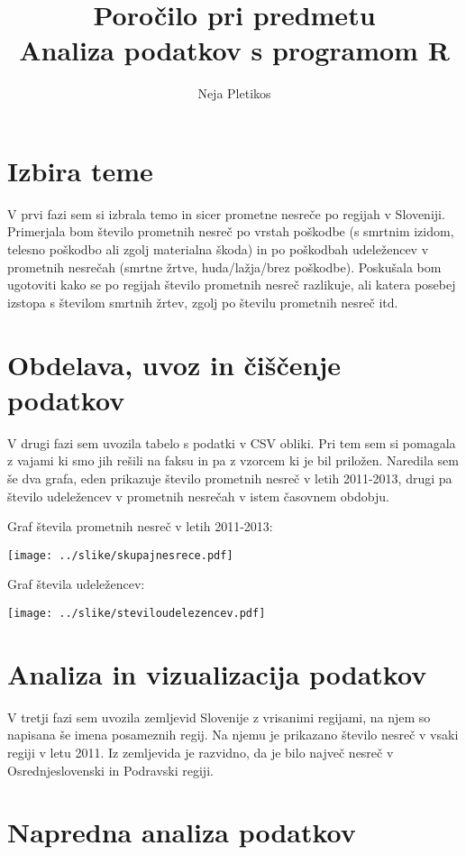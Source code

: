 \documentclass[11pt,a4paper]{article}
\begin{document}
\title{Poročilo pri predmetu \\
Analiza podatkov s programom R}
\author{Neja Pletikos}
\maketitle

\section{Izbira teme}

V prvi fazi sem si izbrala temo in sicer prometne nesreče po regijah v Sloveniji. Primerjala bom število prometnih nesreč po vrstah poškodbe (s smrtnim izidom, telesno poškodbo ali zgolj materialna škoda) in po poškodbah udeležencev v prometnih nesrečah (smrtne žrtve, huda/lažja/brez poškodbe). Poskušala bom ugotoviti kako se po regijah število prometnih nesreč razlikuje, ali katera posebej izstopa s številom smrtnih žrtev, zgolj po številu prometnih nesreč itd.

\section{Obdelava, uvoz in čiščenje podatkov}

V drugi fazi sem uvozila tabelo s podatki v CSV obliki. Pri tem sem si pomagala z vajami ki smo jih rešili na faksu in pa z vzorcem ki je bil priložen. Naredila sem še dva grafa, eden prikazuje število prometnih nesreč v letih 2011-2013, drugi pa število udeležencev v prometnih nesrečah v istem časovnem obdobju.

Graf števila prometnih nesreč v letih 2011-2013:

\texttt{[image: ../slike/skupajnesrece.pdf]}

Graf števila udeležencev:

\texttt{[image: ../slike/steviloudelezencev.pdf]}

\section{Analiza in vizualizacija podatkov}

V tretji fazi sem uvozila zemljevid Slovenije z vrisanimi regijami, na njem so napisana še imena posameznih regij. Na njemu je prikazano število nesreč v vsaki regiji v letu 2011. Iz zemljevida je razvidno, da je bilo največ nesreč v Osrednjeslovenski in Podravski regiji.


\section{Napredna analiza podatkov}
\end{document}
